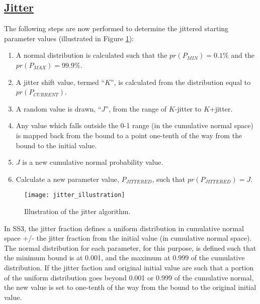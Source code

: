 \hypertarget{Jitter}{}
\subsection[Jitter]{\protect\hyperlink{Jitter}{Jitter}}
The following steps are now performed to determine the jittered starting parameter values (illustrated in Figure \ref{fig:jitter}):
\begin{enumerate}
	\item A normal distribution is calculated such that the $pr(P_{MIN}) = 0.1\%$ and the $pr(P_{MAX}) = 99.9\%$.
	\item A jitter shift value, termed ``$K$'', is calculated from the distribution equal to $pr(P_{CURRENT})$.
	\item A random value is drawn, ``$J$'', from the range of $K$-jitter to $K$+jitter.
	\item Any value which falls outside the 0-1 range (in the cumulative normal space) is mapped back from the bound to a point one-tenth of the way from the bound to the initial value.
	\item $J$ is a new cumulative normal probability value.
	\item Calculate a new parameter value, $P_{JITTERED}$, such that $pr(P_{JITTERED}) = J$.
\end{enumerate}

\begin{figure}[ht]
	\begin{center}
		\texttt{[image: jitter\_illustration]}\\
		\caption{Illustration of the jitter algorithm.}
		\label{fig:jitter}
	\end{center}
\end{figure}

In SS3, the jitter fraction defines a uniform distribution in cumulative normal space +/- the jitter fraction from the initial value (in cumulative normal space). The normal distribution for each parameter, for this purpose, is defined such that the minimum bound is at 0.001, and the maximum at 0.999 of the cumulative distribution. If the jitter faction and original initial value are such that a portion of the uniform distribution goes beyond 0.001 or 0.999 of the cumulative normal, the new value is set to one-tenth of the way from the bound to the original initial value. 

